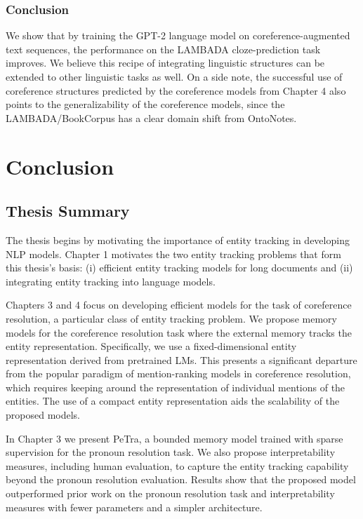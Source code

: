 \documentclass[12pt]{thesis-umich}[thesis]
\begin{document}
\subsection{Conclusion}
We show that by training the GPT-2 language model on coreference-augmented text sequences, the performance on the LAMBADA cloze-prediction task improves. We believe this recipe of integrating linguistic structures can be extended to other linguistic tasks as well. On a side note, the successful use of coreference structures predicted by the coreference models from Chapter 4 also points to the generalizability of the coreference models, since the LAMBADA/BookCorpus has a clear domain shift from OntoNotes. 
 


  \chapter{Conclusion}



\section{Thesis Summary}
The thesis begins by motivating the importance of entity tracking in developing NLP models. 
Chapter 1 motivates the two entity tracking problems that form this thesis's basis: (i) efficient entity tracking models for long documents and (ii) integrating entity tracking into language models. 


Chapters 3 and 4 focus on developing efficient models for the task of coreference resolution, a particular class of entity tracking problem. 
We propose memory models for the coreference resolution task where the external memory tracks the entity representation. 
Specifically, we use a fixed-dimensional entity representation derived from pretrained LMs. This presents a significant departure from the popular paradigm of mention-ranking models in coreference resolution, which requires keeping around the representation of individual mentions of the entities. The use of a compact entity representation aids the scalability of the proposed models. 

In Chapter 3 we present PeTra, a bounded memory model trained with sparse supervision for the pronoun resolution task. We also propose interpretability measures, including human evaluation, to capture the entity tracking capability beyond the pronoun resolution evaluation. 
Results show that the proposed model outperformed prior work on the pronoun resolution task and interpretability measures with fewer parameters and a simpler architecture. 
\end{document}
